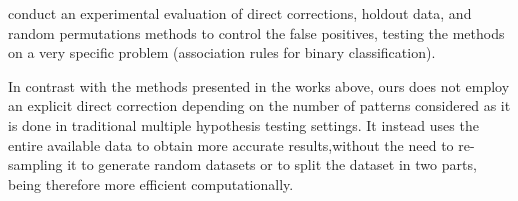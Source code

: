 

\citet{LiuZW11} conduct an experimental evaluation of  direct corrections,
holdout data, and random permutations methods to control the false positives,
testing the methods on a very specific problem (association rules for binary
classification).

In contrast with the methods presented in the works above, ours does not employ
an explicit direct correction depending on the number of patterns considered as
it is done in traditional multiple hypothesis testing settings. It instead uses
the entire available data to obtain more accurate results,without the need to
re-sampling it to generate random datasets or to split the dataset in two parts,
being therefore more efficient computationally.

